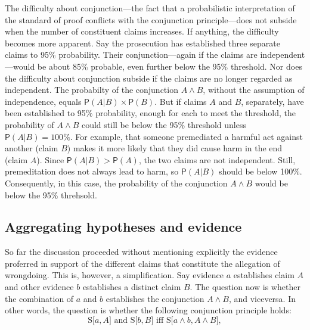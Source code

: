 \documentclass[10pt,dvipsnames,enabledeprecatedfontcommands]{scrartcl}
\newcommand{\et}{\wedge}
\newcommand{\pr}[1]{\mathsf{P}(#1)}
\begin{document}
The difficulty about conjunction---the fact that a probabilistic
interpretation of the standard of proof conflicts with the conjunction
principle---does not subside when the number of constituent claims
increases. If anything, the difficulty becomes more apparent. Say the
prosecution has established three separate claims to 95\% probability.
Their conjunction---again if the claims are independent---would be about
85\% probable, even further below the 95\% threshold. Nor does the
difficulty about conjunction subside if the claims are no longer
regarded as independent. The probabilty of the conjunction \(A \et B\),
without the assumption of independence, equals
\(\pr{A | B} \times \pr{B}\). But if claims \(A\) and \(B\), separately,
have been established to 95\% probability, enough for each to meet the
threshold, the probability of \(A \et B\) could still be below the 95\%
threshold unless \(\pr{A | B}=100\%\). For example, that someone
premediated a harmful act against another (claim \(B\)) makes it more
likely that they did cause harm in the end (claim \(A\)). Since
\(\pr{A | B} > \pr{A}\), the two claims are not independent. Still,
premeditation does not always lead to harm, so \(\pr{A | B}\) should be
below 100\%. Consequently, in this case, the probability of the
conjunction \(A \et B\) would be below the 95\%
threhsold.

\hypertarget{aggregating-hypotheses-and-evidence}{%
\subsection{Aggregating hypotheses and
evidence}\label{aggregating-hypotheses-and-evidence}}

So far the discussion proceeded without mentioning explicitly the
evidence proferred in support of the different claims that constitute
the allegation of wrongdoing. This is, however, a simplification. Say
evidence \(a\) establishes claim \(A\) and other evidence \(b\)
establishes a distinct claim \(B\). The question now is whether the
combination of \(a\) and \(b\) establishes the conjunction \(A \et B\),
and viceversa. In other words, the question is whether the following
conjunction principle holds:
\[\text{S[$a, A$] and S[$b, B$] iff S[$a \wedge b, A\wedge B$]},\]
\end{document}
